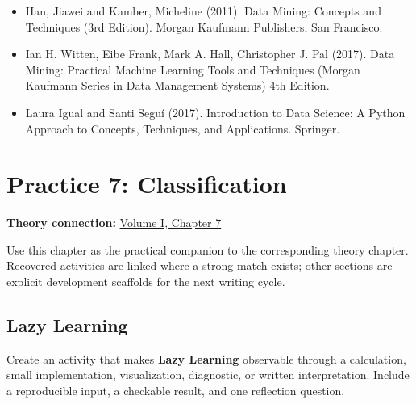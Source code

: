 \documentclass[
  letterpaper,
]{scrbook}
\providecommand{\tightlist}{%
  \setlength{\itemsep}{0pt}\setlength{\parskip}{0pt}}
\begin{document}

\begin{itemize}
\tightlist
\item
  Han, Jiawei and Kamber, Micheline (2011). Data Mining: Concepts and
  Techniques (3rd Edition). Morgan Kaufmann Publishers, San Francisco.
\item
  Ian H. Witten, Eibe Frank, Mark A. Hall, Christopher J. Pal (2017).
  Data Mining: Practical Machine Learning Tools and Techniques (Morgan
  Kaufmann Series in Data Management Systems) 4th Edition.
\item
  Laura Igual and Santi Seguí (2017). Introduction to Data Science: A
  Python Approach to Concepts, Techniques, and Applications. Springer.
\end{itemize}

\chapter*{Practice 7: Classification}\label{ch-practice-07}


\textbf{Theory connection:} \hyperref[ch-classification]{Volume I,
Chapter 7}

Use this chapter as the practical companion to the corresponding theory
chapter. Recovered activities are linked where a strong match exists;
other sections are explicit development scaffolds for the next writing
cycle.

\section*{Lazy Learning}\label{sec-pr-07-lazy-learning}


\begin{tcolorbox}[enhanced jigsaw, arc=.35mm, bottomrule=.15mm, bottomtitle=1mm, breakable, colback=white, colbacktitle=quarto-callout-note-color!10!white, colframe=quarto-callout-note-color-frame, coltitle=black, left=2mm, leftrule=.75mm, opacityback=0, opacitybacktitle=0.6, rightrule=.15mm, title=\textcolor{quarto-callout-note-color}{\faInfo}\hspace{0.5em}{Practice development scaffold}, titlerule=0mm, toprule=.15mm, toptitle=1mm]

Create an activity that makes \textbf{Lazy Learning} observable through
a calculation, small implementation, visualization, diagnostic, or
written interpretation. Include a reproducible input, a checkable
result, and one reflection question.

\end{tcolorbox}
\end{document}
